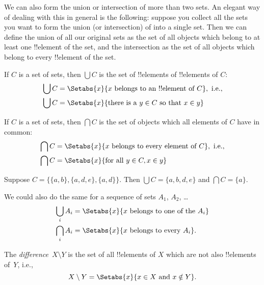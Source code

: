 \documentclass[../../../include/open-logic-section]{subfiles}
\begin{document}
\begin{explain}
We can also form the union or intersection of more than two
sets. An elegant way of dealing with this in general is the
following: suppose you collect all the sets you want to form the union
(or intersection) of into a single set. Then we can define the union
of all our original sets as the set of all objects which belong to at
least one !!{element} of the set, and the intersection as the set of
all objects which belong to every !!{element} of the set.
\end{explain}

\begin{defn}
If $C$ is a set of sets, then $\bigcup C$ is the set of !!{element}s of
!!{element}s of $C$:
\begin{align*}
\bigcup C & = \Setabs{x}{x \text{ belongs to an !!{element} of } C},
\text{ i.e.,}\\
\bigcup C & = \Setabs{x}{\text{there is a } y \in C
  \text{ so that } x \in y}
\end{align*}
\end{defn}

\begin{defn}
If $C$ is a set of sets, then $\bigcap C$ is the set of objects which
all elements of $C$ have in common:
\begin{align*}
\bigcap C & = \Setabs{x}{x \text{ belongs to every element of } C},
\text{ i.e.,}\\
\bigcap C & = \Setabs{x}{\text{for all } y \in C, x \in y}
\end{align*}
\end{defn}

\begin{ex}
Suppose $C = \{ \{ a, b \}, \{ a, d, e \}, \{ a, d \} \}$.
Then $\bigcup C = \{ a, b, d, e \}$ and $\bigcap C = \{ a \}$.
\end{ex}

We could also do the same for a sequence of sets $A_1$, $A_2$, \dots
\begin{align*}
\bigcup_i A_i & = \Setabs{x}{x \text{ belongs to one of the } A_i}\\
\bigcap_i A_i & = \Setabs{x}{x \text{ belongs to every } A_i}.
\end{align*}

\begin{defn}
The \emph{difference}~$X \setminus Y$ is the set of all !!{element}s of
$X$ which are not also !!{element}s of~$Y$, i.e.,
\[
X\setminus Y = \Setabs{x}{x\in X \text{ and } x \notin Y}.
\]
\end{defn}
\end{document}
